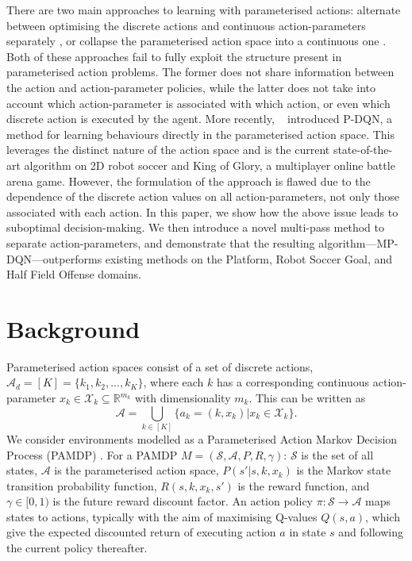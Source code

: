 \documentclass{article}
\newcommand{\Real}{\mathbb{R}}
\def\PDQN*{P\nobreakdash-DQN}
\def\MPDQN*{MP\nobreakdash-DQN}
\newcommand{\citet}[1]
{\citeauthor{#1}~\shortcite{#1}}
\newcommand{\citep}{\cite}
\begin{document}
There are two main approaches to learning with parameterised actions: alternate between optimising the discrete actions and continuous action-parameters separately \citep{masson2016,khamassi2017}, or collapse the parameterised action space into a continuous one \citep{hausknecht2016}. Both of these approaches fail to fully exploit the structure present in parameterised action problems. The former does not share information between the action and action-parameter policies, while the latter does not take into account which action-parameter is associated with which action, or even which discrete action is executed by the agent. More recently, \citet{xiong2018} introduced \PDQN*, a method for learning behaviours directly in the parameterised action space. This leverages the distinct nature of the action space and is the current state-of-the-art algorithm on 2D robot soccer and King of Glory, a multiplayer online battle arena game. However, the formulation of the approach is flawed due to the dependence of the discrete action values on all action-parameters, not only those associated with each action. In this paper, we show how the above issue leads to suboptimal decision-making. We then introduce a novel multi-pass method to separate action-parameters, and demonstrate that the resulting algorithm---\MPDQN*---outperforms existing methods on the Platform, Robot Soccer Goal, and Half Field Offense domains.

\section{Background}

Parameterised action spaces \citep{masson2016} consist of a set of discrete actions, $\mathcal{A}_d= [K]=\{k_1,k_2,... ,k_K\}$, where each $k$ has a corresponding continuous action-parameter \mbox{$x_k \in \mathcal{X}_k \subseteq \Real^{m_k}$} with dimensionality $m_k$. This can be written as
\begin{equation}\label{eq:parameterised_action_spaces}
\mathcal{A} = \bigcup_{k \in [K]} \{a_k = (k, x_k) | x_k \in \mathcal{X}_k\}.
\end{equation}
We consider environments modelled as a Parameterised Action Markov Decision Process (PAMDP) \cite{masson2016}. For a PAMDP \mbox{$M = (\mathcal{S},\mathcal{A},P,R,\gamma)$}: $\mathcal{S}$ is the set of all states, $\mathcal{A}$ is the parameterised action space, $P(s'|s,k,x_k)$ is the Markov state transition probability function, $R(s,k,x_k,s')$ is the reward function, and $\gamma \in [0,1)$ is the future reward discount factor. An action policy $\pi: \mathcal{S} \rightarrow \mathcal{A}$ maps states to actions, typically with the aim of maximising Q-values $Q(s,a)$, which give the expected discounted return of executing action $a$  in state $s$ and following the current policy thereafter. 
\end{document}
